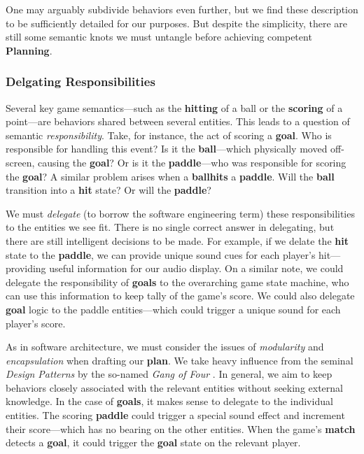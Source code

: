 \documentclass{report}
\newcommand{\plan}{\textbf{Planning}\xspace}
\newcommand{\state}[1]{\textbf{#1}}
\newcommand{\pad}{\textbf{paddle}\xspace}
\newcommand{\ball}{\textbf{ball}\xspace}
\begin{document}
One may arguably subdivide behaviors even further, but we find these description to be sufficiently detailed for our purposes. But despite the simplicity, there are still some semantic knots we must untangle before achieving competent \plan. 

\subsubsection{Delgating Responsibilities}

Several key game semantics---such as the \state{hitting} of a ball or the \state{scoring} of a point---are behaviors shared between several entities. This leads to a question of semantic \emph{responsibility}. Take, for instance, the act of scoring a \state{goal}. Who is responsible for handling this event? Is it the \ball---which physically moved off-screen, causing the \state{goal}? Or is it the \pad---who was responsible for scoring the \state{goal}? A similar problem arises when a \ball \state{hits} a \pad. Will the \ball transition into a \state{hit} state? Or will the \pad? 

We must \emph{delegate} (to borrow the software engineering term) these responsibilities to the entities we see fit. There is no single correct answer in delegating, but there are still intelligent decisions to be made. For example, if we delate the \state{hit} state to the \pad, we can provide unique sound cues for each player's hit---providing useful information for our audio display. On a similar note, we could delegate the responsibility of \state{goals} to the overarching game state machine, who can use this information to keep tally of the game's score. We could also delegate \state{goal} logic to the paddle entities---which could trigger a unique sound for each player's score.

As in software architecture, we must consider the issues of \emph{modularity} and \emph{encapsulation} when drafting our \state{plan}. We take heavy influence from the seminal \emph{Design Patterns} by the so-named \emph{Gang of Four} \cite{gamma1994design}. In general, we aim to keep behaviors closely associated with the relevant entities without seeking external knowledge. In the case of \state{goals}, it makes sense to delegate to the individual entities. The scoring \pad could trigger a special sound effect and increment their score---which has no bearing on the other entities. When the game's \state{match} detects a \state{goal}, it could trigger the \state{goal} state on the relevant player. 
\end{document}
